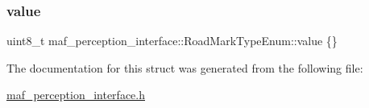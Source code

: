 \subsubsection{\texorpdfstring{value}{value}}
{\footnotesize\ttfamily uint8\+\_\+t maf\+\_\+perception\+\_\+interface\+::\+Road\+Mark\+Type\+Enum\+::value \{\}}



The documentation for this struct was generated from the following file\+:\begin{DoxyCompactItemize}
\item 
\hyperlink{maf__perception__interface_8h}{maf\+\_\+perception\+\_\+interface.\+h}\end{DoxyCompactItemize}
